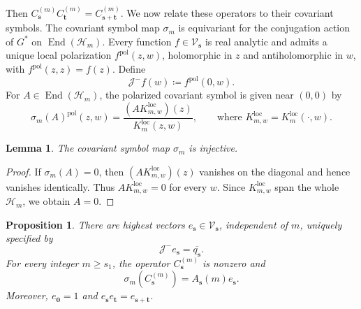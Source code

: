 \documentclass[11pt,reqno]{amsart}
\newtheorem{lemma}[theorem]{Lemma}
\theoremstyle{corollary}
\theoremstyle{conjecture}
\theoremstyle{assumption}
\theoremstyle{proposition}
\newtheorem{proposition}[theorem]{Proposition}
\theoremstyle{remark}
\numberwithin{equation}{section}
\begin{document}
Then $C_{\mathbf s}^{(m)}C_{\mathbf t}^{(m)}=C_{\mathbf s+\mathbf t}^{(m)}$. We now relate these operators to their covariant symbols. The covariant symbol map $\sigma_m$ is equivariant for the conjugation action of $G^*$ on $\operatorname{End}(\mathcal H_m)$. Every function $f\in\mathcal V_{\mathbf s}$ is real analytic and admits a unique local polarization $f^{\mathrm{pol}}(z,w)$, holomorphic in $z$ and antiholomorphic in $w$, with $f^{\mathrm{pol}}(z,z)=f(z)$. Define
\[
\mathcal J^-f(w)\coloneq f^{\mathrm{pol}}(0,w).
\]
For $A\in\operatorname{End}(\mathcal H_m)$, the polarized covariant symbol is given near $(0,0)$ by
\[
\sigma_m(A)^{\mathrm{pol}}(z,w)=\frac{(AK_{m,w}^{\operatorname{loc}})(z)}{K_m^{\operatorname{loc}}(z,w)},\qquad \text{where }K_{m,w}^{\operatorname{loc}}=K_m^{\operatorname{loc}}(\cdot,w).
\]
\begin{lemma}\label{lem:pre-symbol-injective}
The covariant symbol map $\sigma_m$ is injective.
\end{lemma}
\begin{proof}
If $\sigma_m(A)=0$, then $(AK_{m,w}^{\operatorname{loc}})(z)$ vanishes on the diagonal and hence vanishes identically. Thus $AK_{m,w}^{\operatorname{loc}}=0$ for every $w$. Since $K_{m,w}^{\operatorname{loc}}$ span the whole $\mathcal H_m$, we obtain $A=0$.
\end{proof}
\begin{proposition}\label{prop:pre-highest-symbols}
There are highest vectors $e_{\mathbf s}\in\mathcal V_{\mathbf s}$, independent of $m$, uniquely specified by
\[
\mathcal J^-e_{\mathbf s}=\overline{q_{\mathbf s}}.
\]
For every integer $m\geq s_1$, the operator $C_{\mathbf s}^{(m)}$ is nonzero and
\[
\sigma_m(C_{\mathbf s}^{(m)})=A_{\mathbf s}(m)e_{\mathbf s}.
\]
Moreover, $e_{\mathbf0}=1$ and $e_{\mathbf s}e_{\mathbf t}=e_{\mathbf s+\mathbf t}$.
\end{proposition}
\end{document}
